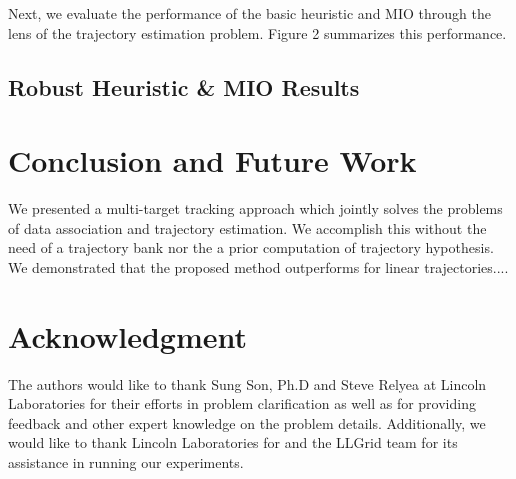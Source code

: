 \documentclass[journal]{IEEEtran}
\begin{document}
Next, we evaluate the performance of the basic heuristic and MIO through the lens of the trajectory estimation problem. Figure 2 summarizes this performance.  

\subsection{Robust Heuristic \& MIO Results}


\section{Conclusion and Future Work}
We presented a multi-target tracking approach which jointly solves the problems of data association and trajectory estimation. We accomplish this without the need of a trajectory bank nor the a prior computation of trajectory hypothesis. We demonstrated that the proposed method outperforms for linear trajectories....

\section*{Acknowledgment}
The authors would like to thank Sung Son, Ph.D and Steve Relyea at Lincoln Laboratories for their efforts in problem clarification as well as for providing feedback and other expert knowledge on the problem details. Additionally, we would like to thank Lincoln Laboratories for and the LLGrid team for its assistance in running our experiments. 







%

\end{document}
